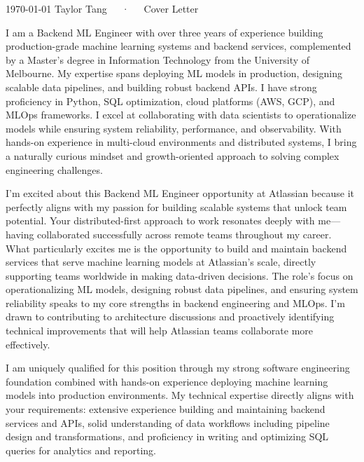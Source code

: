 \documentclass[11pt, a4paper]{awesome-cv}
\begin{document}
\makecvheader[R]

\makecvfooter
  {\today}
  {Taylor Tang~~~·~~~Cover Letter}
  {}

\makelettertitle

\begin{cvletter}

  I am a Backend ML Engineer with over three years of experience building production-grade machine learning systems and backend services, complemented by a Master's degree in Information Technology from the University of Melbourne. My expertise spans deploying ML models in production, designing scalable data pipelines, and building robust backend APIs. I have strong proficiency in Python, SQL optimization, cloud platforms (AWS, GCP), and MLOps frameworks. I excel at collaborating with data scientists to operationalize models while ensuring system reliability, performance, and observability. With hands-on experience in multi-cloud environments and distributed systems, I bring a naturally curious mindset and growth-oriented approach to solving complex engineering challenges.
  
  I'm excited about this Backend ML Engineer opportunity at Atlassian because it perfectly aligns with my passion for building scalable systems that unlock team potential. Your distributed-first approach to work resonates deeply with me—having collaborated successfully across remote teams throughout my career. What particularly excites me is the opportunity to build and maintain backend services that serve machine learning models at Atlassian's scale, directly supporting teams worldwide in making data-driven decisions. The role's focus on operationalizing ML models, designing robust data pipelines, and ensuring system reliability speaks to my core strengths in backend engineering and MLOps. I'm drawn to contributing to architecture discussions and proactively identifying technical improvements that will help Atlassian teams collaborate more effectively.
  
  I am uniquely qualified for this position through my strong software engineering foundation combined with hands-on experience deploying machine learning models into production environments. My technical expertise directly aligns with your requirements: extensive experience building and maintaining backend services and APIs, solid understanding of data workflows including pipeline design and transformations, and proficiency in writing and optimizing SQL queries for analytics and reporting. 
  

\end{cvletter}
\end{document}
